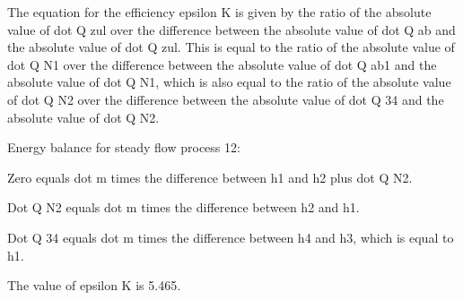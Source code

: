 The equation for the efficiency epsilon K is given by the ratio of the absolute value of dot Q zul over the difference between the absolute value of dot Q ab and the absolute value of dot Q zul. This is equal to the ratio of the absolute value of dot Q N1 over the difference between the absolute value of dot Q ab1 and the absolute value of dot Q N1, which is also equal to the ratio of the absolute value of dot Q N2 over the difference between the absolute value of dot Q 34 and the absolute value of dot Q N2.

Energy balance for steady flow process 12:

Zero equals dot m times the difference between h1 and h2 plus dot Q N2.

Dot Q N2 equals dot m times the difference between h2 and h1.

Dot Q 34 equals dot m times the difference between h4 and h3, which is equal to h1.

The value of epsilon K is 5.465.